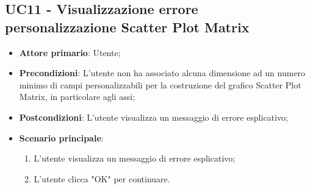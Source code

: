 \subsection{UC11 - Visualizzazione errore personalizzazione Scatter Plot Matrix}
\begin{itemize}
	\item \textbf{Attore primario}: Utente;
	\item \textbf{Precondizioni}: L'utente non ha associato alcuna dimensione ad un numero minimo di campi personalizzabili per la costruzione del grafico Scatter Plot Matrix, in particolare agli assi;
	\item \textbf{Postcondizioni}: L'utente visualizza un messaggio di errore esplicativo;
	\item \textbf{Scenario principale}:
		\begin{enumerate}
			\item L'utente visualizza un messaggio di errore esplicativo;
			\item L'utente clicca "OK" per continuare.
		\end{enumerate}
\end{itemize}